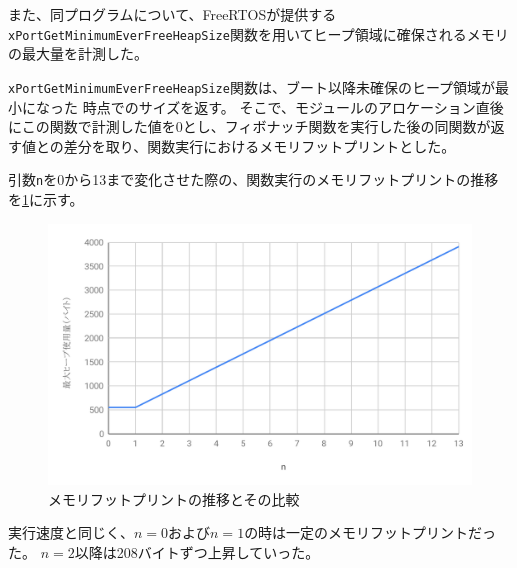 また、同プログラムについて、FreeRTOSが提供する\verb|xPortGetMinimumEverFreeHeapSize|関数を用いてヒープ領域に確保されるメモリの最大量を計測した。

\verb|xPortGetMinimumEverFreeHeapSize|関数は、ブート以降未確保のヒープ領域が最小になった
時点でのサイズを返す。
そこで、モジュールのアロケーション直後にこの関数で計測した値を0とし、フィボナッチ関数を実行した後の同関数が返す値との差分を取り、関数実行におけるメモリフットプリントとした。

引数\verb|n|を0から13まで変化させた際の、関数実行のメモリフットプリントの推移を\ref{fig:heap_size}に示す。

\begin{figure}[htbp]
  \caption{メモリフットプリントの推移とその比較}
  \label{fig:heap_size}
  \begin{center}
    \includegraphics[bb=0 0 600 370,width=12cm]{img/heap_size.pdf}
  \end{center}
\end{figure}

実行速度と同じく、$n=0$および$n=1$の時は一定のメモリフットプリントだった。
$n=2$以降は208バイトずつ上昇していった。

